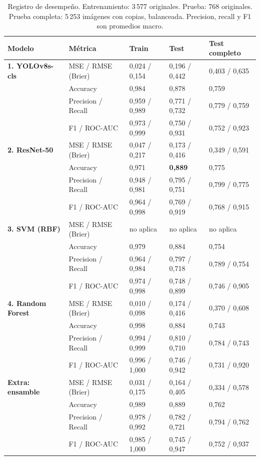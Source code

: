 \begin{table}[htbp]
\centering\small
\caption{Registro de desempeño. Entrenamiento: 3\,577 originales. Prueba: 768 originales. Prueba completa: 5\,253 imágenes con copias, balanceada. Precision, recall y F1 son promedios macro.}
\label{tab:registro}
\begin{tabular}{lllll}
\toprule
Modelo & Métrica & Train & Test & Test completo \\
\midrule
\textbf{1. YOLOv8s-cls} & MSE / RMSE (Brier) & 0,024 / 0,154 & 0,196 / 0,442 & 0,403 / 0,635 \\
 & Accuracy & 0,984 & 0,878 & 0,759 \\
 & Precision / Recall & 0,959 / 0,989 & 0,771 / 0,732 & 0,779 / 0,759 \\
 & F1 / ROC-AUC & 0,973 / 0,999 & 0,750 / 0,931 & 0,752 / 0,923 \\
\textbf{2. ResNet-50} & MSE / RMSE (Brier) & 0,047 / 0,217 & 0,173 / 0,416 & 0,349 / 0,591 \\
 & Accuracy & 0,971 & \textbf{0,889} & 0,775 \\
 & Precision / Recall & 0,948 / 0,981 & 0,795 / 0,751 & 0,799 / 0,775 \\
 & F1 / ROC-AUC & 0,964 / 0,998 & 0,769 / 0,919 & 0,768 / 0,915 \\
\textbf{3. SVM (RBF)} & MSE / RMSE (Brier) & no aplica & no aplica & no aplica \\
 & Accuracy & 0,979 & 0,884 & 0,754 \\
 & Precision / Recall & 0,964 / 0,984 & 0,797 / 0,718 & 0,789 / 0,754 \\
 & F1 / ROC-AUC & 0,974 / 0,998 & 0,748 / 0,899 & 0,746 / 0,905 \\
\textbf{4. Random Forest} & MSE / RMSE (Brier) & 0,010 / 0,098 & 0,174 / 0,416 & 0,370 / 0,608 \\
 & Accuracy & 0,998 & 0,884 & 0,743 \\
 & Precision / Recall & 0,994 / 0,999 & 0,810 / 0,710 & 0,784 / 0,743 \\
 & F1 / ROC-AUC & 0,996 / 1,000 & 0,746 / 0,942 & 0,731 / 0,920 \\
\textbf{Extra: ensamble} & MSE / RMSE (Brier) & 0,031 / 0,175 & 0,164 / 0,405 & 0,334 / 0,578 \\
 & Accuracy & 0,989 & 0,889 & 0,762 \\
 & Precision / Recall & 0,978 / 0,992 & 0,782 / 0,721 & 0,794 / 0,762 \\
 & F1 / ROC-AUC & 0,985 / 1,000 & 0,745 / 0,947 & 0,752 / 0,937 \\
\bottomrule
\end{tabular}
\end{table}


